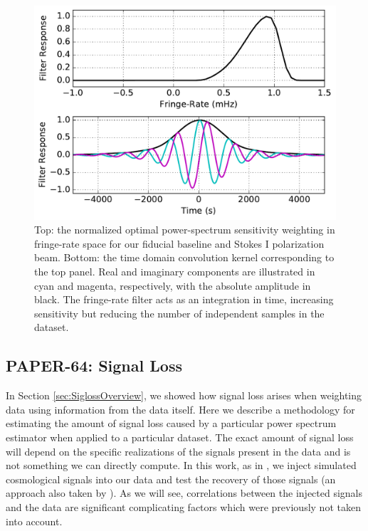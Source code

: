 \documentclass[preprint2,numberedappendix,tighten]{aastex6}  %
\begin{document}
\begin{figure}
	\centering
	\includegraphics[width=\columnwidth]{plots/frp.pdf}
	\caption{Top: the normalized optimal power-spectrum sensitivity weighting in fringe-rate space for our fiducial baseline and 
Stokes I polarization beam. Bottom: the time domain convolution kernel corresponding to the top panel. Real and imaginary 
components are illustrated in cyan and magenta, respectively, with the absolute amplitude in black. The fringe-rate filter acts as 
an integration in time, increasing sensitivity but reducing the number of independent samples in the dataset.}
	\label{fig:frp}
\end{figure}


\subsection{PAPER-64: Signal Loss}
\label{sec:Sigloss}

In Section \ref{sec:SiglossOverview}, we showed how signal loss arises when weighting data using information from the data itself. Here we describe a methodology for estimating the amount of signal loss caused by a particular power spectrum estimator when applied to a particular dataset. The exact amount of signal loss will depend on the specific realizations of the signals present in the data and is not something we can directly compute. In this work, as in , we inject simulated cosmological signals into our data and test the recovery of those signals (an approach also taken by \citet{masui_et_al2013}). As we will see, correlations between the injected signals and the data are significant complicating factors which were previously not taken into account. 
\end{document}
